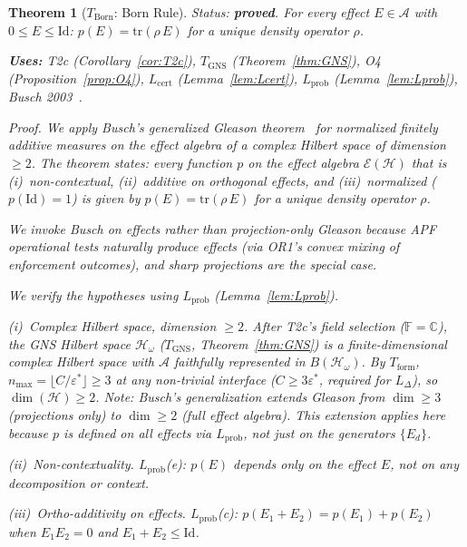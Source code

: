\documentclass[11pt,a4paper]{article}
\newtheorem{theorem}{Theorem}[section]
\theoremstyle{definition}
\newcommand{\eps}{\varepsilon}
\newcommand{\tr}{\mathrm{tr}}
\begin{document}
\begin{theorem}[$T_{\mathrm{Born}}$: Born Rule]\label{thm:Born}
\textit{Status: \textbf{proved}.}  For every effect $E \in \mathcal{A}$ with $0 \le E \le \mathrm{Id}$: $p(E) = \tr(\rho\,E)$ for a unique density operator $\rho$.

\smallskip\noindent\textbf{Uses:} T2c (Corollary~\ref{cor:T2c}), $T_{\mathrm{GNS}}$ (Theorem~\ref{thm:GNS}), O4 (Proposition~\ref{prop:O4}), $L_{\mathrm{cert}}$ (Lemma~\ref{lem:Lcert}), $L_{\mathrm{prob}}$ (Lemma~\ref{lem:Lprob}), Busch 2003~\cite{Busch2003}.

\smallskip\noindent\textit{Proof.}  We apply Busch's generalized Gleason theorem~\cite{Busch2003} for normalized finitely additive measures on the effect algebra of a complex Hilbert space of dimension $\ge 2$.  The theorem states: \textit{every function $p$ on the effect algebra $\mathcal{E}(\mathcal{H})$ that is (i)~non-contextual, (ii)~additive on orthogonal effects, and (iii)~normalized ($p(\mathrm{Id}) = 1$) is given by $p(E) = \tr(\rho\,E)$ for a unique density operator $\rho$.}

We invoke Busch on effects rather than projection-only Gleason because APF operational tests naturally produce effects (via OR1's convex mixing of enforcement outcomes), and sharp projections are the special case.

\smallskip\noindent We verify the hypotheses using $L_{\mathrm{prob}}$ (Lemma~\ref{lem:Lprob}).

\smallskip\noindent(i)~\textit{Complex Hilbert space, dimension $\ge 2$.}  After T2c's field selection ($\mathbb{F} = \mathbb{C}$), the GNS Hilbert space $\mathcal{H}_\omega$ ($T_{\mathrm{GNS}}$, Theorem~\ref{thm:GNS}) is a finite-dimensional complex Hilbert space with $\mathcal{A}$ faithfully represented in $B(\mathcal{H}_\omega)$.  By $T_{\mathrm{form}}$, $n_{\max} = \lfloor C/\eps^*\rfloor \ge 3$ at any non-trivial interface ($C \ge 3\eps^*$, required for $L_\Delta$), so $\dim(\mathcal{H}) \ge 2$.  \textit{Note:} Busch's generalization extends Gleason from $\dim \ge 3$ (projections only) to $\dim \ge 2$ (full effect algebra).  This extension applies here because $p$ is defined on all effects via $L_{\mathrm{prob}}$, not just on the generators $\{E_d\}$.

\smallskip\noindent(ii)~\textit{Non-contextuality.}  $L_{\mathrm{prob}}$(e): $p(E)$ depends only on the effect $E$, not on any decomposition or context.

\smallskip\noindent(iii)~\textit{Ortho-additivity on effects.}  $L_{\mathrm{prob}}$(c): $p(E_1 + E_2) = p(E_1) + p(E_2)$ when $E_1 E_2 = 0$ and $E_1 + E_2 \le \mathrm{Id}$.


\end{theorem}
\end{document}
